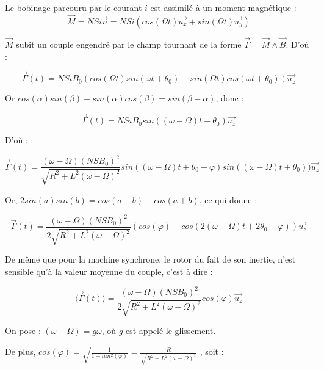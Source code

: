 \documentclass{article}
\begin{document}
Le bobinage parcouru par le courant $i$ est assimilé à un moment magnétique :
\begin{equation}
    \vec{M} = NSi\vec{n} = NSi(cos(\Omega t) \vec{u_x} + sin(\Omega t)\vec{u_y})
\end{equation}

$\vec{M}$ subit un couple engendré par le champ tournant de la forme $ \vec{\Gamma} = \vec{M} \land \vec{B} $. D'où :

\begin{equation}
    \vec{\Gamma}(t) = NSiB_0(cos(\Omega t) sin(\omega t + \theta_0) - sin(\Omega t)cos(\omega t + \theta_0))\vec{u_z}
\end{equation}

Or $cos(\alpha)sin(\beta) - sin(\alpha)cos(\beta) = sin(\beta - \alpha)$, donc :

\begin{equation}
    \vec{\Gamma}(t) = NSiB_0 sin ((\omega - \Omega) t + \theta_0) \vec{u_z}
\end{equation}

D'où :

\begin{equation}
     \vec{\Gamma}(t) = \frac{(\omega - \Omega)(NSB_0)^2}{\sqrt{R^2+L^2(\omega - \Omega)^2}} sin((\omega - \Omega) t + \theta_0 - \varphi)sin((\omega - \Omega) t + \theta_0))\vec{u_z}
\end{equation}

Or, $2sin(a)sin(b) = cos(a - b) - cos(a+b)$, ce qui donne :

\begin{equation}
     \vec{\Gamma}(t) = \frac{(\omega - \Omega)(NSB_0)^2}{2\sqrt{R^2+L^2(\omega - \Omega)^2}} (cos(\varphi) - cos (2(\omega - \Omega) t + 2 \theta_0 - \varphi))\vec{u_z}
\end{equation}

De même que pour la machine synchrone, le rotor du fait de son inertie, n'est sensible qu'à la valeur moyenne du couple, c'est à dire :

\begin{equation}
    \langle \vec{\Gamma}(t) \rangle = \frac{(\omega - \Omega)(NSB_0)^2}{2\sqrt{R^2+L^2(\omega - \Omega)^2}} cos(\varphi) \vec{u_z}
\end{equation}

On pose : $(\omega - \Omega) = g\omega$, où $g$ est appelé le glissement.\medskip

De plus, $cos(\varphi) = \sqrt{\frac{1}{1 + tan^2 (\varphi)}}= \frac{R}{\sqrt{R^2 + L^2(\omega -\Omega)^2}}$ , soit :
\end{document}

